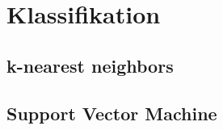 \chapter{Klassifikation}

\blindtext

\section{k-nearest neighbors}

\blindtext

\section{Support Vector Machine}

\blindtext